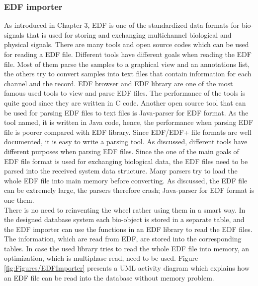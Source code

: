 \subsubsection{EDF importer}
As introduced in Chapter 3, EDF is one of the standardized data formats for bio-signals that is used for storing and exchanging multichannel biological and physical signals. There are many tools and open source codes which can be used for reading a EDF file. Different tools have different goals when reading the EDF file. Most of them parse the samples to a graphical view and an annotations list, the others try to convert samples into text files that contain information for each channel and the record. EDF browser and EDF library\citep{EDFLIB} are one of the most famous used tools to view and parse EDF files. The performance of the tools is quite good since they are written in C code. Another open source tool that can be used for parsing EDF files to text files is Java-parser for EDF format\citep{EDF4J}. As the tool named, it is written in Java code, hence, the performance when parsing EDF file is poorer compared with EDF library. Since EDF/EDF+ file formats are well documented, it is easy to write a parsing tool. As discussed, different tools have different purposes when parsing EDF files. Since the one of the main goals of EDF file format is used for exchanging biological data, the EDF files need to be parsed into the received system data structure. Many parsers try to load the whole EDF file into main memory before converting. As discussed, the EDF file can be extremely large, the parsers therefore crash; Java-parser for EDF format is one them.\\
There is no need to reinventing the wheel rather using them in a smart way. In the designed database system each bio-object is stored in a separate table, and the EDF importer can use the functions in an EDF library to read the EDF files. The information, which are read from EDF, are stored into the corresponding tables. In case the used library tries to read the whole EDF file into memory, an optimization, which is multiphase read, need to be used. Figure \ref{fig:Figures/EDFImporter} presents a UML activity diagram which explains how an EDF file can be read into the database without memory problem.
